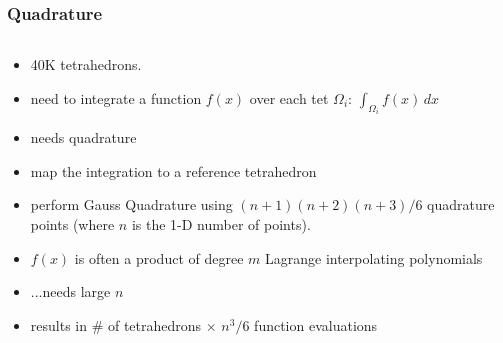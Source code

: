 \documentclass[10pt]{beamer}
\begin{document}
\begin{frame}
\frametitle{Quadrature}
\begin{columns}
\begin{column}{0.45\textwidth}
\begin{center}
\end{center}
\end{column}
\begin{column}{0.45\textwidth}
\begin{center}
\end{center}
\end{column}
\end{columns}
\begin{itemize}
  \item 40K tetrahedrons.
  \item need to integrate a function $f(x)$ over each tet $\Omega_i$: $\int_{\Omega_i} f(x)\,dx$
  \item needs quadrature
  \item map the integration to a reference tetrahedron
  \item perform Gauss Quadrature using $(n+1)(n+2)(n+3)/6$ quadrature
points (where $n$ is the 1-D number of points).
  \item $f(x)$ is often a product of degree $m$ Lagrange interpolating
polynomials
  \item ...needs large $n$
  \item results in \# of tetrahedrons $\times$ $n^3/6$ function evaluations
\end{itemize}
\end{frame}
\end{document}
